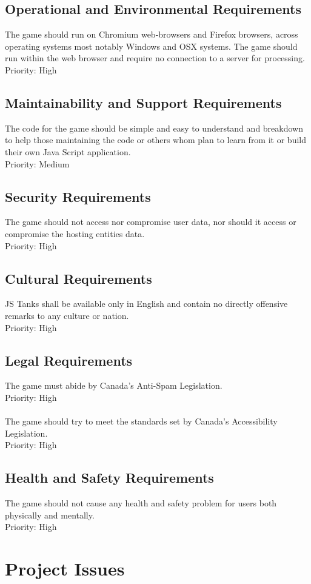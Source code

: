 \documentclass[12pt, titlepage]{article}
\begin{document}
\subsection{Operational and Environmental Requirements}
The game should run on Chromium web-browsers and Firefox browsers, across 
operating systems most notably Windows and OSX systems. The game should run 
within the web browser and require no connection to a server for processing.\\Priority: High
\subsection{Maintainability and Support Requirements}
The code for the game should be simple and easy to understand and breakdown 
to help those maintaining the code or others whom plan to learn from it or 
build their own Java Script application.\\Priority: Medium
\subsection{Security Requirements}
The game should not access nor compromise user data, nor should it access or 
compromise the hosting entities data.\\Priority: High
\subsection{Cultural Requirements}
JS Tanks shall be available only in English and contain no directly offensive 
remarks to any culture or nation.\\Priority: High
\subsection{Legal Requirements}
The game must abide by Canada's Anti-Spam Legislation.\\Priority: High
\\\\The game should try to meet the standards set by Canada's Accessibility 
Legislation.\\Priority: High
\subsection{Health and Safety Requirements}
The game should not cause any health and safety problem for users both physically and mentally.
\\Priority: High
\section{Project Issues}
\end{document}

